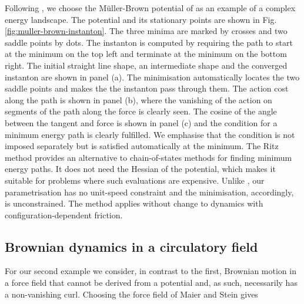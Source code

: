 Following \citep{olender1997yet}, we choose the Müller-Brown potential
of \citep{muller1979location} as an example of a complex energy landscape.
The potential and its stationary points are shown in Fig. \ref{fig:muller-brown-instanton}.
The three minima are marked by crosses and two saddle points by dots.
The instanton is computed by requiring the path to start at the minimum
on the top left and terminate at the minimum on the bottom right.
The initial straight line shape, an intermediate shape and the converged
instanton are shown in panel (a). The minimisation automatically locates
the two saddle points and makes the the instanton pass through them.
The action cost along the path is shown in panel (b), where the vanishing
of the action on segments of the path along the force is clearly seen.
The cosine of the angle between the tangent and force is shown in
panel (c) and the condition for a minimum energy path is clearly fulfilled.
We emphasise that the condition is not imposed separately but is satisfied
automatically at the minimum. The Ritz method provides an alternative
to chain-of-states methods for finding minimum energy paths. It does
not need the Hessian of the potential, which makes it suitable for
problems where such evaluations are expensive. Unlike \citep{heymannGeometricMinimumAction2008a},
our parametrisation has no unit-speed constraint and the minimisation,
accordingly, is unconstrained. The method applies without change to
dynamics with configuration-dependent friction. 


\subsection{Brownian dynamics in a circulatory field}

For our second example we consider, in contrast to the first, Brownian motion
in a force field that cannot be derived from a potential and, as such,
necessarily has a non-vanishing curl. Choosing the force field of
Maier and Stein \citep{maier1996scaling} gives

